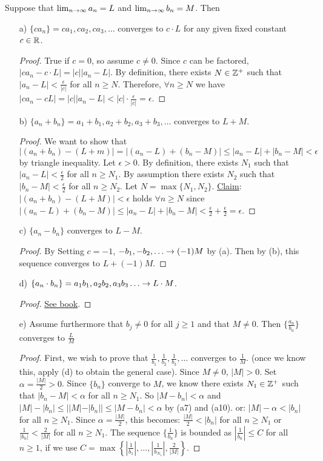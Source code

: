 \documentclass[]{article}
\begin{document}
\begin{theorem}
	Suppose that $\lim_{n\rightarrow\infty} a_n = L$ and $\lim_{n\rightarrow\infty} b_n = M$. Then 
	\begin{enumerate}
		\item[a)] $\{ca_n\} = ca_1,ca_2,ca_3,\dots$ converges to $c\cdot L$ for any given fixed constant $c\in\mathbb{R}$.
		\begin{proof}
			True if $c=0$, so assume $c\neq 0$. Since $c$ can be factored, $|ca_n-c\cdot L| = |c||a_n-L|$. By definition, there exists $N\in\mathbb{Z}^+$ such that $|a_n-L|<\frac{\epsilon}{|c|}$ for all $n\geq N$. Therefore, $\forall n\geq N$ we have $|ca_n-cL|=|c||a_n-L| < |c|\cdot \frac{\epsilon}{|c|} = \epsilon$.
		\end{proof}
		\item[b)] $\{a_n+b_n\} = a_1+b_1,a_2+b_2,a_3+b_3,\dots$ converges to $L+M$.
		\begin{proof}
			We want to show that $|(a_n+b_n) - (L+m)| = |(a_n-L)+(b_n-M)|\leq |a_n-L| + |b_n-M| <\epsilon$ by triangle inequality. Let $\epsilon>0$. By definition, there exists $N_1$ such that $|a_n-L|<\frac{\epsilon}{2}$ for all $n\geq N_1$. By assumption there exists $N_2$ such that $|b_n-M|<\frac{\epsilon}{2}$ for all $n\geq N_2$. Let $N=\max{\{N_1,N_2\}}$.
			\ul{Claim}: $|(a_n+b_n) - (L+M)|< \epsilon$ holds $\forall n\geq N$ since $|(a_n-L)+(b_n-M)|\leq |a_n-L|+|b_n-M| <\frac{\epsilon}{2} + \frac{\epsilon}{2} = \epsilon$.
		\end{proof}
		\item[c)] $\{a_n-b_n\}$ converges to $L-M$.
		\begin{proof}
			By Setting $c=-1$, $-b_1,-b_2,\dots \ra (-1) M$ by (a). Then by (b), this sequence converges to $L+(-1)M$.
		\end{proof}
		\item[d)] $\{a_n\cdot b_n\}= a_1b_1,a_2b_2,a_3b_3\dots \ra L\cdot M$.
		\begin{proof}
			\ul{See book}.
		\end{proof}
		\item[e)] Assume furthermore that $b_j\neq 0$ for all $j\geq 1$ and that $M\neq 0$. Then $\{\frac{a_n}{b_n}\}$ converges to $\frac{L}{M}$
		\begin{proof}
			First, we wish to prove that $\frac{1}{b_1},\frac{1}{b_2},\frac{1}{b_3},\dots$ converges to $\frac{1}{M}$. (once we know this, apply (d) to obtain the general case). Since $M\neq 0$, $|M|>0$. Set $\alpha = \frac{|M|}{2}>0$. Since $\{b_n\}$ converge to $M$, we know there exists $N_1\in\mathbb{Z}^+$ such that $|b_n-M|<\alpha$ for all $n\geq N_1$. So $|M-b_n|<\alpha$ and $ |M|-|b_n| \leq ||M|-|b_n||\leq |M-b_n|<\alpha$ by (a7) and (a10). or: $|M|-\alpha < |b_n|$ for all $n\geq N_1$. Since $\alpha = \frac{|M|}{2}$, this becomes: $\frac{|M|}{2} < |b_n|$ for all $n\geq N_1$ or $\frac{1}{|b_n|}<\frac{2}{|M|}$ for all $n\geq N_1$. The sequence $\{\frac{1}{b_n}\}$ is bounded as $\left| \frac{1}{b_n} \right| \leq C$ for all $n\geq 1$, if we use $C = \max{\left\{\left|\frac{1}{b_1}\right|,\dots,\left|\frac{1}{b_{N_1}}\right|,\frac{2}{\left|M\right|}\right\}}$.
		\end{proof}
	\end{enumerate}
	\label{thm2.7}
\end{theorem}
\end{document}
